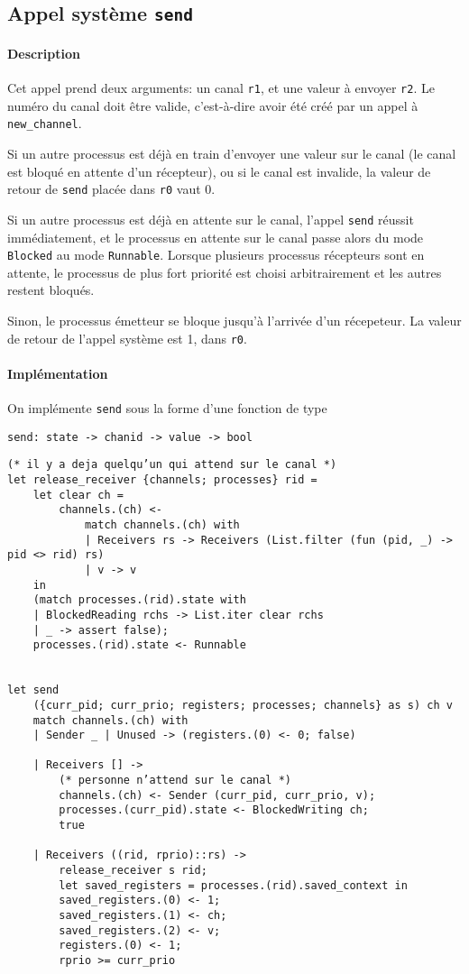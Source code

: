 \documentclass[french, toc]{../cs-classes/cs-classes}
\begin{document}
\subsection{Appel système \texttt{send}}
\paragraph*{Description} 
Cet appel prend deux arguments: un canal \texttt{r1}, et une valeur à envoyer \texttt{r2}. Le numéro du canal doit être valide, c'est-à-dire avoir été créé par un appel à \texttt{new\_channel}. 

Si un autre processus est déjà en train d'envoyer une valeur sur le canal (le canal est bloqué en attente d'un récepteur), ou si le canal est invalide, la valeur de retour de \texttt{send} placée dans \texttt{r0} vaut 0. 

Si un autre processus est déjà en attente sur le canal, l'appel \texttt{send} réussit immédiatement, et le processus en attente sur le canal passe alors du mode \texttt{Blocked} au mode \texttt{Runnable}. Lorsque plusieurs processus récepteurs sont en attente, le processus de plus fort priorité est choisi arbitrairement et les autres restent bloqués.

Sinon, le processus émetteur se bloque jusqu'à l'arrivée d'un récepeteur. La valeur de retour de l'appel système est 1, dans \texttt{r0}.

\paragraph*{Implémentation} On implémente \texttt{send} sous la forme d'une fonction de type
\begin{center}
    \texttt{send: state -> chanid -> value -> bool}
\end{center}

\begin{verbatim}
(* il y a deja quelqu’un qui attend sur le canal *)
let release_receiver {channels; processes} rid =
    let clear ch =
        channels.(ch) <-
            match channels.(ch) with
            | Receivers rs -> Receivers (List.filter (fun (pid, _) -> pid <> rid) rs)
            | v -> v
    in
    (match processes.(rid).state with
    | BlockedReading rchs -> List.iter clear rchs
    | _ -> assert false);
    processes.(rid).state <- Runnable


let send
    ({curr_pid; curr_prio; registers; processes; channels} as s) ch v
    match channels.(ch) with
    | Sender _ | Unused -> (registers.(0) <- 0; false)

    | Receivers [] ->
        (* personne n’attend sur le canal *)
        channels.(ch) <- Sender (curr_pid, curr_prio, v);
        processes.(curr_pid).state <- BlockedWriting ch;
        true

    | Receivers ((rid, rprio)::rs) ->
        release_receiver s rid;
        let saved_registers = processes.(rid).saved_context in
        saved_registers.(0) <- 1;
        saved_registers.(1) <- ch;
        saved_registers.(2) <- v;
        registers.(0) <- 1;
        rprio >= curr_prio
\end{verbatim}
\end{document}
